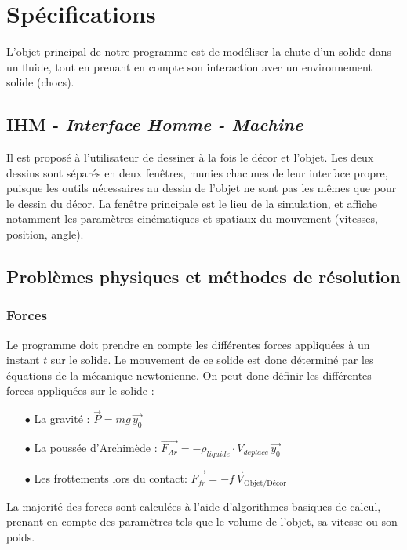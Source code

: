 \section{Spécifications}
L'objet principal de notre programme est de modéliser la chute d'un solide dans un
fluide, tout en prenant en compte son interaction avec un environnement solide (chocs).

\subsection{IHM - \emph{Interface Homme - Machine}}
Il est proposé à l'utilisateur de dessiner à la fois le décor et l'objet.
Les deux dessins sont séparés en deux fenêtres, munies chacunes de leur interface propre,
puisque les outils nécessaires au dessin de l'objet ne sont pas les mêmes que pour le dessin du décor.
La fenêtre principale est le lieu de la simulation, et affiche notamment les paramètres cinématiques
et spatiaux du mouvement (vitesses, position, angle).

\subsection{Problèmes physiques et méthodes de résolution}
\subsubsection{Forces}
Le programme doit prendre en compte les différentes forces appliquées à 
un instant $t$ sur le solide. Le mouvement de ce solide est donc déterminé
par les équations de la mécanique newtonienne.
On peut donc définir les différentes forces appliquées sur le solide :

\begin{itemize}
\item[$\bullet$] La gravité : \dotfill{} $\overrightarrow{P} = mg\, \overrightarrow{y_0}$ 
\item[$\bullet$] La poussée d'Archimède : \dotfill{} $\overrightarrow{F_{Ar}} = -\rho_{liquide}\cdot V_{deplace} \, \overrightarrow{y_0} $
\item[$\bullet$] Les frottements lors du contact: \dotfill{}$\overrightarrow{F_{fr}} = -f \,\overrightarrow{V}_{\text{Objet/Décor}}$
\end{itemize}

La majorité des forces sont calculées à l'aide d'algorithmes basiques de
calcul, prenant en compte des paramètres tels que le volume de l'objet,
sa vitesse ou son poids.
